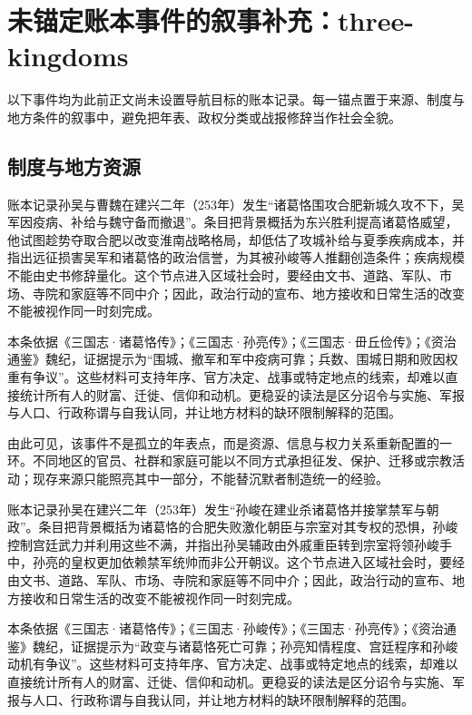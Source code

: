 \section{未锚定账本事件的叙事补充：three-kingdoms}

\label{sec:anchor-batch-two-three-kingdoms}

以下事件均为此前正文尚未设置导航目标的账本记录。每一锚点置于来源、制度与地方条件的叙事中，避免把年表、政权分类或战报修辞当作社会全貌。

\subsection{制度与地方资源}

账本记录孙吴与曹魏在建兴二年（253年）发生“诸葛恪围攻合肥新城久攻不下，吴军因疫病、补给与魏守备而撤退”。条目把背景概括为东兴胜利提高诸葛恪威望，他试图趁势夺取合肥以改变淮南战略格局，却低估了攻城补给与夏季疾病成本，并指出远征损害吴军和诸葛恪的政治信誉，为其被孙峻等人推翻创造条件；疾病规模不能由史书修辞量化。这个节点进入区域社会时，要经由文书、道路、军队、市场、寺院和家庭等不同中介；因此，政治行动的宣布、地方接收和日常生活的改变不能被视作同一时刻完成。

本条依据《三国志·诸葛恪传》；《三国志·孙亮传》；《三国志·毌丘俭传》；《资治通鉴》魏纪，证据提示为“围城、撤军和军中疫病可靠；兵数、围城日期和败因权重有争议”。这些材料可支持年序、官方决定、战事或特定地点的线索，却难以直接统计所有人的财富、迁徙、信仰和动机。更稳妥的读法是区分诏令与实施、军报与人口、行政称谓与自我认同，并让地方材料的缺环限制解释的范围。

由此可见，该事件不是孤立的年表点，而是资源、信息与权力关系重新配置的一环。不同地区的官员、社群和家庭可能以不同方式承担征发、保护、迁移或宗教活动；现存来源只能照亮其中一部分，不能替沉默者制造统一的经验。

账本记录孙吴在建兴二年（253年）发生“孙峻在建业杀诸葛恪并接掌禁军与朝政”。条目把背景概括为诸葛恪的合肥失败激化朝臣与宗室对其专权的恐惧，孙峻控制宫廷武力并利用这些不满，并指出孙吴辅政由外戚重臣转到宗室将领孙峻手中，孙亮的皇权更加依赖禁军统帅而非公开朝议。这个节点进入区域社会时，要经由文书、道路、军队、市场、寺院和家庭等不同中介；因此，政治行动的宣布、地方接收和日常生活的改变不能被视作同一时刻完成。

本条依据《三国志·诸葛恪传》；《三国志·孙峻传》；《三国志·孙亮传》；《资治通鉴》魏纪，证据提示为“政变与诸葛恪死亡可靠；孙亮知情程度、宫廷程序和孙峻动机有争议”。这些材料可支持年序、官方决定、战事或特定地点的线索，却难以直接统计所有人的财富、迁徙、信仰和动机。更稳妥的读法是区分诏令与实施、军报与人口、行政称谓与自我认同，并让地方材料的缺环限制解释的范围。

